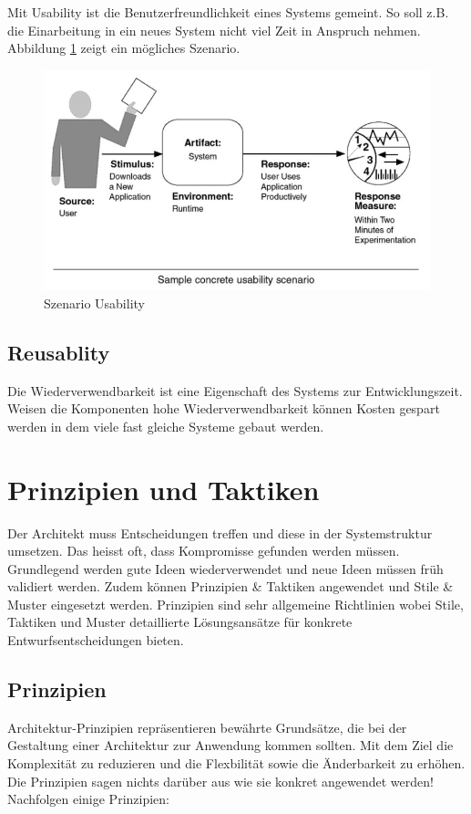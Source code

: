 Mit Usability ist die Benutzerfreundlichkeit eines Systems gemeint. So soll z.B. die Einarbeitung in ein neues System nicht viel Zeit in Anspruch nehmen. Abbildung \ref{fig:usability} zeigt ein mögliches Szenario.

\begin{figure}[h!]
\centering
\includegraphics[width=0.7\linewidth]{fig/usability}
\caption{Szenario Usability}
\label{fig:usability}
\end{figure}

\subsection{Reusablity}

Die Wiederverwendbarkeit ist eine Eigenschaft des Systems zur Entwicklungszeit. Weisen die Komponenten hohe Wiederverwendbarkeit können Kosten gespart werden in dem viele fast gleiche Systeme gebaut werden.

\section{Prinzipien und Taktiken}
Der Architekt muss Entscheidungen treffen und diese in der Systemstruktur umsetzen. Das heisst oft, dass Kompromisse gefunden werden müssen. Grundlegend werden gute Ideen wiederverwendet und neue Ideen müssen früh validiert werden. Zudem können Prinzipien \& Taktiken angewendet und Stile \& Muster eingesetzt werden. Prinzipien sind sehr allgemeine Richtlinien wobei Stile, Taktiken und Muster detaillierte Lösungsansätze für konkrete Entwurfsentscheidungen bieten.

\subsection{Prinzipien}
Architektur-Prinzipien repräsentieren bewährte Grundsätze, die bei der Gestaltung einer Architektur zur Anwendung kommen sollten. Mit dem Ziel die Komplexität zu reduzieren und die Flexbilität sowie die Änderbarkeit zu erhöhen. Die Prinzipien sagen nichts darüber aus wie sie konkret angewendet werden! Nachfolgen einige Prinzipien:


